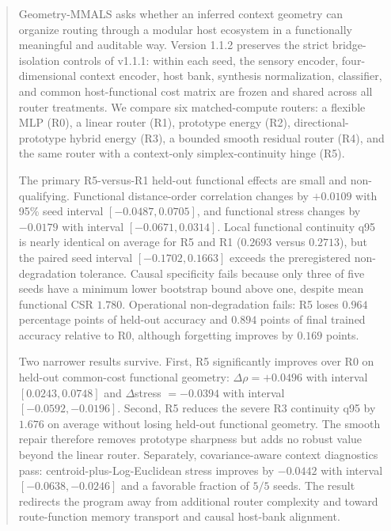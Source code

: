 \documentclass[11pt,a4paper]{article}
\begin{document}
\begin{abstract}
Geometry-MMALS asks whether an inferred context geometry can organize routing through a modular host ecosystem in a functionally meaningful and auditable way. Version 1.1.2 preserves the strict bridge-isolation controls of v1.1.1: within each seed, the sensory encoder, four-dimensional context encoder, host bank, synthesis normalization, classifier, and common host-functional cost matrix are frozen and shared across all router treatments. We compare six matched-compute routers: a flexible MLP (R0), a linear router (R1), prototype energy (R2), directional-prototype hybrid energy (R3), a bounded smooth residual router (R4), and the same router with a context-only simplex-continuity hinge (R5).

The primary R5-versus-R1 held-out functional effects are small and non-qualifying. Functional distance-order correlation changes by $+0.0109$ with 95\% seed interval $[-0.0487,0.0705]$, and functional stress changes by $-0.0179$ with interval $[-0.0671,0.0314]$. Local functional continuity q95 is nearly identical on average for R5 and R1 ($0.2693$ versus $0.2713$), but the paired seed interval $[-0.1702,0.1663]$ exceeds the preregistered non-degradation tolerance. Causal specificity fails because only three of five seeds have a minimum lower bootstrap bound above one, despite mean functional CSR $1.780$. Operational non-degradation fails: R5 loses $0.964$ percentage points of held-out accuracy and $0.894$ points of final trained accuracy relative to R0, although forgetting improves by $0.169$ points.

Two narrower results survive. First, R5 significantly improves over R0 on held-out common-cost functional geometry: $\Delta\rho=+0.0496$ with interval $[0.0243,0.0748]$ and $\Delta$stress $=-0.0394$ with interval $[-0.0592,-0.0196]$. Second, R5 reduces the severe R3 continuity q95 by $1.676$ on average without losing held-out functional geometry. The smooth repair therefore removes prototype sharpness but adds no robust value beyond the linear router. Separately, covariance-aware context diagnostics pass: centroid-plus-Log-Euclidean stress improves by $-0.0442$ with interval $[-0.0638,-0.0246]$ and a favorable fraction of $5/5$ seeds. The result redirects the program away from additional router complexity and toward route-function memory transport and causal host-bank alignment.
\end{abstract}

\tableofcontents
\clearpage
\end{document}

